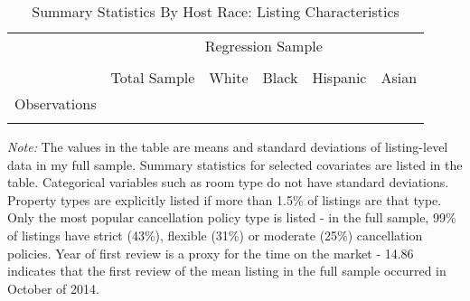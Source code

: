 \begin{table}[htbp]
\caption{Summary Statistics By Host Race: Listing Characteristics}
\begin{center}%
\small\begin{tabular}{l c c c c c}
& \multicolumn{5}{c}{Regression Sample}
\\
 \cmidrule(r){2-6}
\\
 & \multicolumn{1}{c}{Total Sample} & White & Black & Hispanic & Asian
\\
\hline\hline\noalign{\smallskip} 
\hline
Observations &  &  &  &  & 
\\
\hline\hline\noalign{\smallskip} \end{tabular} 
\begin{minipage}{6in}
{\it Note:} The values in the table are means and standard deviations of listing-level data in my full sample. Summary statistics for selected covariates are listed in the table. Categorical variables such as room type do not have standard deviations. Property types are explicitly listed if more than 1.5\% of listings are that type. Only the most popular cancellation policy type is listed - in the full sample, 99\% of listings have strict (43\%), flexible (31\%) or moderate (25\%) cancellation policies. Year of first review is a proxy for the time on the market - 14.86 indicates that the first review of the mean listing in the full sample occurred in October of 2014.
\end{minipage}
\end{center}
\end{table}
